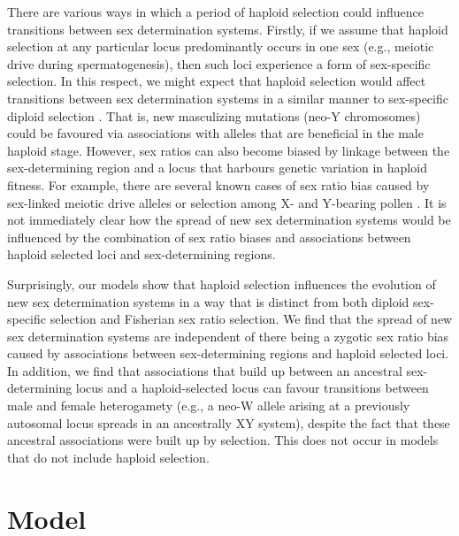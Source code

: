 \documentclass[12pt]{article}
\begin{document}
There are various ways in which a period of haploid selection could influence transitions between sex determination systems. 
Firstly, if we assume that haploid selection at any particular locus predominantly occurs in one sex (e.g., meiotic drive during spermatogenesis), then such loci experience a form of sex-specific selection. 
In this respect, we might expect that haploid selection would affect transitions between sex determination systems in a similar manner to sex-specific diploid selection \citep[as explored by][]{vanDoorn:2007eu,vanDoorn:2010hu}. 
That is, new masculizing mutations (neo-Y chromosomes) could be favoured via associations with alleles that are beneficial in the male haploid stage. 
However, sex ratios can also become biased by linkage between the sex-determining region and a locus that harbours genetic variation in haploid fitness. 
For example, there are several known cases of sex ratio bias caused by sex-linked meiotic drive alleles \citep[][, Chapter 3]{Burt:2006} or selection among X- and Y-bearing pollen \citep{Lloyd:1974tz,Conn:1981uw,Stehlik:2005ul,Stehlik:2006to,Field:2012fd,Field:2013cc}. 
It is not immediately clear how the spread of new sex determination systems would be influenced by the combination of sex ratio biases and associations between haploid selected loci and sex-determining regions. 

Surprisingly, our models show that haploid selection influences the evolution of new sex determination systems in a way that is distinct from both diploid sex-specific selection and Fisherian sex ratio selection. 
We find that the spread of new sex determination systems are independent of there being a zygotic sex ratio bias caused by associations between sex-determining regions and haploid selected loci. 
In addition, we find that associations that build up between an ancestral sex-determining locus and a haploid-selected locus can favour transitions between male and female heterogamety (e.g., a neo-W allele arising at a previously autosomal locus spreads in an ancestrally XY system), despite the fact that these ancestral associations were built up by selection. 
This does not occur in models that do not include haploid selection. 

\section*{Model}
\end{document}
